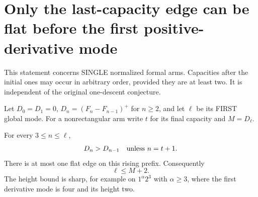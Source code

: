 \section{Only the last-capacity edge can be flat before the first positive-derivative mode}
This statement concerns SINGLE normalized formal arms. Capacities after
the initial ones may occur in arbitrary order, provided they are at least
two. It is independent of the original one-descent conjecture.

Let $D_0=D_1=0$, $D_n=(F_n-F_{n-1})^+$ for $n\ge2$, and let
$\ell$ be its FIRST global mode. For a nonrectangular arm write $t$
for its final capacity and $M=D_\ell$.

\begin{theorem}
For every $3\le n\le\ell$,
\[
      D_n>D_{n-1}\quad\hbox{unless }n=t+1.
\]
There is at most one flat edge on this rising prefix. Consequently
\[
                             \boxed{\ell\le M+2.}       \tag{1}
\]
The height bound is sharp, for example on $1^\alpha2^3$ with
$\alpha\ge3$, where the first derivative mode is four and its height two.
\end{theorem}
